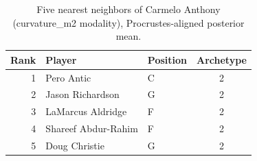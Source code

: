 \begin{table}[htbp]
  \centering\small
  \begin{tabular}{rllc}
    \toprule
    Rank & Player & Position & Archetype \\
    \midrule
    1 & Pero Antic & C & 2 \\
    2 & Jason Richardson & G & 2 \\
    3 & LaMarcus Aldridge & F & 2 \\
    4 & Shareef Abdur-Rahim & F & 2 \\
    5 & Doug Christie & G & 2 \\
    \bottomrule
  \end{tabular}
  \caption{Five nearest neighbors of Carmelo Anthony (curvature_m2 modality), Procrustes-aligned posterior mean.}
  \label{tab:Carmelo_Anthony_neighbors_curvature_m2}
\end{table}

